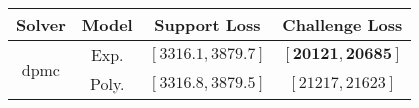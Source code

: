 \begin{tabular}{cc|c|c} 
\hline 
 Solver & Model & Support Loss  & Challenge Loss \tabularnewline\hline 
\hline 
\multirow{2}{*}{dpmc} & Exp. & $\mathbf{\left[3316.1,3879.7\right]}$ & $\mathbf{\left[20121,20685\right]}$ \tabularnewline 
 & Poly. & $\left[3316.8,3879.5\right]$ & $\left[21217,21623\right]$ \tabularnewline 
\hline 
\end{tabular} 

